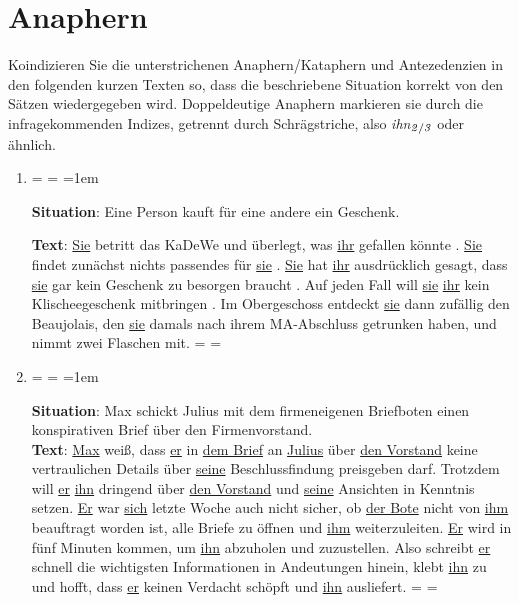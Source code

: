 \documentclass[12pt,a4paper,twoside]{article}
\newcommand{\Sub}[1]{\ensuremath{_{\text{#1}}}}
\newenvironment{spread}
{%
  \newdimen\origiwspc%
  \newdimen\origiwstr%
  \origiwspc=\fontdimen2\font%
  \origiwstr=\fontdimen3\font%
  \fontdimen2\font=1em%
  \doublespacing%
}{%
  \fontdimen2\font=\origiwspc%
  \fontdimen3\font=\origiwstr%
}
\begin{document}
\newpage

\section{Anaphern}

Koindizieren Sie die unterstrichenen Anaphern\slash Kataphern und Antezedenzien in den folgenden kurzen Texten so, dass die beschriebene Situation korrekt von den Sätzen wiedergegeben wird.
Doppeldeutige Anaphern markieren sie durch die infragekommenden Indizes, getrennt durch Schrägstriche, also \textit{ihn}\Sub{\textit{2}\slash\textit{3}} oder ähnlich.

\begin{enumerate}
  \item\doublespacing%
    \begin{spread}
      \textbf{Situation}: Eine Person kauft für eine andere ein Geschenk.
      
      \textbf{Text}: \uline{Sie} betritt das KaDeWe und überlegt, was \uline{ihr} gefallen könnte .
      \uline{Sie} findet zunächst nichts passendes für \uline{sie} .
      \uline{Sie} hat \uline{ihr} ausdrücklich gesagt, dass \uline{sie} gar kein Geschenk zu besorgen braucht .
      Auf jeden Fall will \uline{sie} \uline{ihr} kein Klischeegeschenk mitbringen .
      Im Obergeschoss entdeckt \uline{sie} dann zufällig den Beaujolais, den \uline{sie} damals nach ihrem MA-Abschluss getrunken haben, und nimmt zwei Flaschen mit.\end{spread}
  \item\doublespacing
    \begin{spread}
      \textbf{Situation}: Max schickt Julius mit dem firmeneigenen Briefboten einen konspirativen Brief über den Firmenvorstand.\\

      \textbf{Text}: \uline{Max} weiß, dass \uline{er} in \uline{dem Brief} an \uline{Julius} über \uline{den Vorstand} keine vertraulichen Details über \uline{seine} Beschlussfindung preisgeben darf.
      Trotzdem will \uline{er} \uline{ihn} dringend über \uline{den Vorstand} und \uline{seine} Ansichten in Kenntnis setzen.
      \uline{Er} war \uline{sich} letzte Woche auch nicht sicher, ob \uline{der Bote} nicht von \uline{ihm} beauftragt worden ist, alle Briefe zu öffnen und \uline{ihm} weiterzuleiten.
      \uline{Er} wird in fünf Minuten kommen, um \uline{ihn} abzuholen und zuzustellen.
      Also schreibt \uline{er} schnell die wichtigsten Informationen in Andeutungen hinein, klebt \uline{ihn} zu und hofft, dass \uline{er} keinen Verdacht schöpft und \uline{ihn} ausliefert.
  \end{spread}
\end{enumerate}
\end{document}
